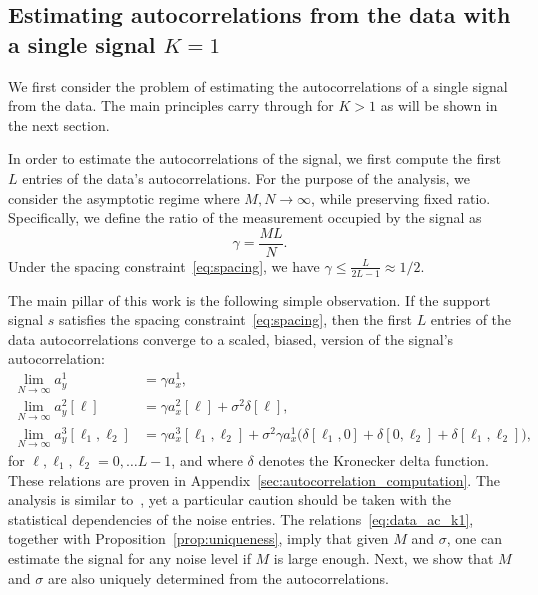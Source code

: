 \documentclass[english,11pt]{article}
\numberwithin{equation}{section}
\theoremstyle{plain}
\theoremstyle{definition}
\theoremstyle{remark}
\theoremstyle{plain}
\theoremstyle{remark}
\theoremstyle{plain}
\theoremstyle{plain}
\begin{document}
\subsection{Estimating autocorrelations from the data with a single signal $K=1$} \label{sec:estimating_ac_k1}

We first consider the problem of estimating the autocorrelations of a single signal from the data. 
The main principles carry through for $K>1$ as will be shown in the next section.  

In order to estimate the autocorrelations of the signal, we first compute the first $L$ entries of the data's autocorrelations. 
For the purpose of the analysis, we consider  the asymptotic regime where $M,N\to\infty$, while preserving fixed ratio. 
Specifically, we define the ratio of the measurement occupied by  the signal as
\begin{equation}
\gamma = \frac{M L}{N}.
\end{equation}
Under the spacing constraint~\eqref{eq:spacing}, we have $\gamma\leq\frac{L}{2L-1}\approx 1/2$.

The main pillar of this work is the following simple observation.
If the support signal $s$ satisfies the spacing constraint~\eqref{eq:spacing}, then the first $L$ entries of the data autocorrelations converge 
to a scaled, biased, version of the signal's autocorrelation:
\begin{align}
\lim_{N\to\infty} a_y^1 & = \gamma a_{x}^1, \nonumber\\
\lim_{N\to\infty} a_y^2[\ell] & = \gamma a_{x}^2[\ell] +\sigma^2\delta[\ell], \label{eq:data_ac_k1} \\
\lim_{N\to\infty} a_y^3[\ell_1,\ell_2] & = \gamma a_{x}^3[\ell_1,\ell_2] + \sigma^2\gamma a_{x}^1 \big(\delta[\ell_1,0]+\delta[0,\ell_2]+\delta[\ell_1,\ell_2]\big), \nonumber
\end{align}
for $\ell,\ell_1,\ell_2=0,\ldots L-1$, and where $\delta$ denotes the Kronecker delta function. 
These relations are proven in Appendix~\ref{sec:autocorrelation_computation}. The analysis is similar to~\cite{bendory2017bispectrum,boumal2017heterogeneous}, yet a particular caution should be taken with the statistical dependencies of the noise entries. 
The relations~\eqref{eq:data_ac_k1}, together with Proposition~\ref{prop:uniqueness}, imply that given $M$ and $\sigma$, one can estimate the signal for any noise level if $M$ is large enough. Next, we show that  $M$ and $\sigma$ are also uniquely determined from the autocorrelations. 
\end{document}
